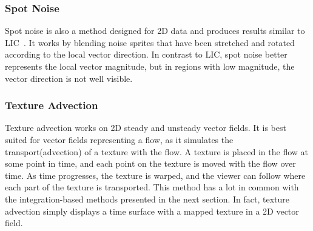 %
\subsubsection{Spot Noise}
%
Spot noise is also a method designed for \ac{2D} data and produces results
similar to \ac{LIC}~\cite{Wijk1991,Leeuw1995}.
%
It works by blending noise sprites that have been stretched and rotated
according to the local vector direction.
%
In contrast to \ac{LIC}, spot noise better represents the local vector
magnitude, but in regions with low magnitude, the vector direction is not well
visible.
%

%
\subsubsection{Texture Advection}
%
Texture advection works on \ac{2D} steady and unsteady vector fields.
%
It is best suited for vector fields representing a flow, as it simulates the
transport(advection) of a texture with the flow.
%
A texture is placed in the flow at some point in time, and each point on the
texture is moved with the flow over time.
%
As time progresses, the texture is warped, and the viewer can follow where each
part of the texture is transported.
%
This method has a lot in common with the integration-based methods presented in
the next section.
%
In fact, texture advection simply displays a time surface with a mapped texture
in a \ac{2D} vector field.
%

%
%
